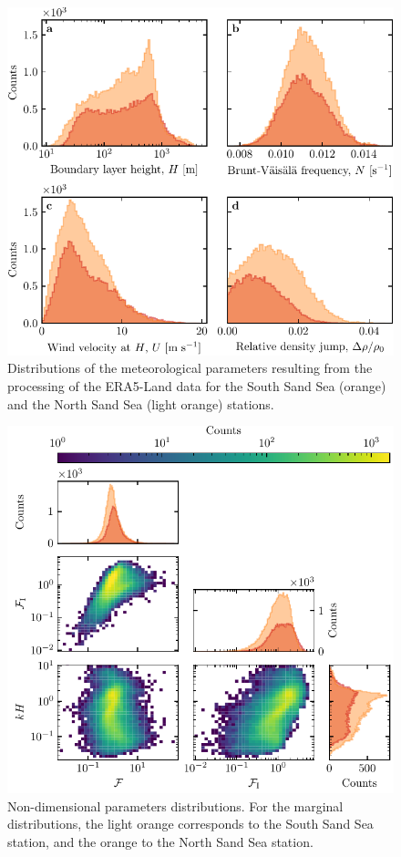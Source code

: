 \begin{figure}[p]
\centering
\includegraphics[scale=1]{Figures/Figure9_supp.pdf}
\caption{Distributions of the meteorological parameters resulting from the processing of the ERA5-Land data for the South Sand Sea (orange) and the North Sand Sea (light orange) stations.}
\label{Fig9_supp}
\end{figure}

\begin{figure}[p]
\centering
\includegraphics[scale=1]{Figures/Figure10_supp.pdf}
\caption{Non-dimensional parameters distributions. For the marginal distributions, the light orange corresponds to the South Sand Sea station, and the orange to the North Sand Sea station.}
\label{Fig10_supp}
\end{figure}

